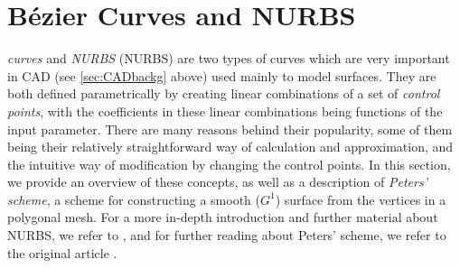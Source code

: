 \section{B{\'e}zier Curves and \acs{NURBS}}
\label{sec:NURBS}
\emph{\Bez curves} and \emph{\acl{NURBS}} (\acs{NURBS}) are two types of curves which are very important in CAD (see \autoref{sec:CADbackg} above) used mainly to model surfaces. They are both defined parametrically by creating linear combinations of a set of \emph{control points}, with the coefficients in these linear combinations being functions of the input parameter. There are many reasons behind their popularity, some of them being their relatively straightforward way of calculation and approximation, and the intuitive way of modification by changing the control points. In this section, we provide an overview of these concepts, as well as a description of \emph{Peters' scheme}, a scheme for constructing a smooth ($G^1$) surface from the vertices in a polygonal mesh. For a  more in-depth introduction and further material about NURBS, we refer to \cite{farin2002handbook}, and for further reading about Peters' scheme, we refer to the original article \cite{peters1992constructing}.





